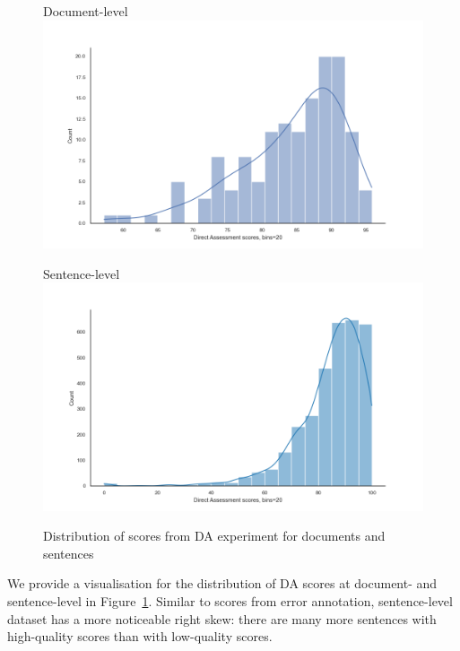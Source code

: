 \label{pg:da_score_hists}
\begin{figure}[H]
	\begin{minipage}[c]{0.5\linewidth}
		\centering
		Document-level
		\includegraphics[width=\linewidth]{figures/da/doc-da-score-distribution}
	\end{minipage}	
	\begin{minipage}[c]{0.5\linewidth}
		\centering
		Sentence-level
		\includegraphics[width=\linewidth]{figures/da/sent-da-score-distribution}
	\end{minipage}
	\caption{\label{fig:da_scores}Distribution of scores from DA experiment for documents and sentences}	
\end{figure}

\vspace*{-1em}
We provide a visualisation for the distribution of DA scores at document- and sentence-level in Figure~\ref{fig:da_scores}. Similar to scores from error annotation, sentence-level dataset has a more noticeable right skew: there are many more sentences with high-quality scores than with low-quality scores. 


